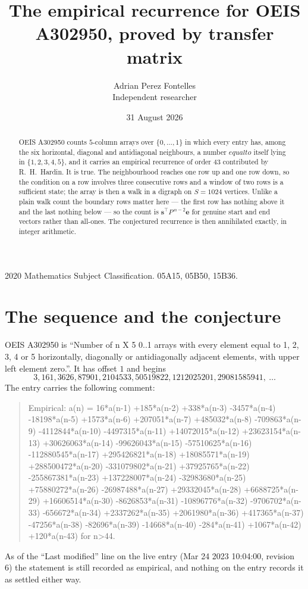 \documentclass[11pt,a4paper]{article}
\title{The empirical recurrence for OEIS A302950, proved by transfer matrix}
\author{Adrian Perez Fontelles\\ \small Independent researcher}
\date{31 August 2026}
\theoremstyle{plain}
\theoremstyle{definition}
\begin{document}
\maketitle

\begin{abstract}
OEIS A302950 counts $5$-column arrays over $\{0,\dots,1\}$ in which every entry has,
among the six horizontal, diagonal and antidiagonal neighbours, a number $equal to$ itself lying in $\{1,2,3,4,5\}$, and it carries an empirical
recurrence of order $43$ contributed by R.~H.~Hardin. It is true. The neighbourhood
reaches one row up and one row down, so the condition on a row involves three consecutive
rows and a window of two rows is a sufficient state; the array is then a walk in a digraph
on $S=1024$ vertices. Unlike a plain walk count the boundary rows matter here --- the first
row has nothing above it and the last nothing below --- so the count is
$\mathbf{s}^{\!\top}P^{\,n-2}\mathbf{e}$ for genuine start and end vectors rather than
all-ones. The conjectured recurrence is then annihilated exactly, in integer arithmetic.
\end{abstract}

\noindent\small 2020 Mathematics Subject Classification. 05A15, 05B50, 15B36.\normalsize

\section{The sequence and the conjecture}

OEIS A302950 is ``Number of n X 5 0..1 arrays with every element equal to 1, 2, 3, 4 or 5 horizontally, diagonally or antidiagonally adjacent elements, with upper left element zero.''. It has offset
$1$ and begins
\[
3, 161, 3626, 87901, 2104533, 50519822, 1212025201, 29081585941,\ \dots
\]
The entry carries the following comment:
\begin{quote}\small
Empirical: a(n) = 16*a(n-1) +185*a(n-2) +338*a(n-3) -3457*a(n-4) -18198*a(n-5) +1573*a(n-6) +207051*a(n-7) +485032*a(n-8) -709863*a(n-9) -4112844*a(n-10) -4497315*a(n-11) +14072015*a(n-12) +23623154*a(n-13) +30626063*a(n-14) -99626043*a(n-15) -57510625*a(n-16) -112880545*a(n-17) +295426821*a(n-18) +18085571*a(n-19) +288500472*a(n-20) -331079802*a(n-21) +37925765*a(n-22) -255867381*a(n-23) +137228007*a(n-24) -32983680*a(n-25) +75880272*a(n-26) -26987488*a(n-27) +29332045*a(n-28) +6688725*a(n-29) +16606514*a(n-30) -8626853*a(n-31) -10896776*a(n-32) -9706702*a(n-33) -656672*a(n-34) +2337262*a(n-35) +2061980*a(n-36) +417365*a(n-37) -47256*a(n-38) -82696*a(n-39) -14668*a(n-40) -284*a(n-41) +1067*a(n-42) +120*a(n-43) for n>44.
\end{quote}
As of the ``Last modified'' line on the live entry (Mar 24 2023 10:04:00, revision
6) the statement is still recorded as empirical, and nothing on the entry
records it as settled either way.
\end{document}
